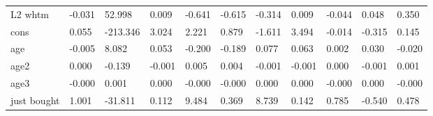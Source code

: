 \begin{table}[htbp]
\begin{tabular}{lllllllllll}
L2 whtm &    -0.031 &    52.998 &     0.009 &    -0.641 &    -0.615 &    -0.314 &     0.009 &    -0.044 &     0.048 &     0.350 \\  
cons &     0.055 &  -213.346 &     3.024 &     2.221 &     0.879 &    -1.611 &     3.494 &    -0.014 &    -0.315 &     0.145 \\  
age &    -0.005 &     8.082 &     0.053 &    -0.200 &    -0.189 &     0.077 &     0.063 &     0.002 &     0.030 &    -0.020 \\  
age2 &     0.000 &    -0.139 &    -0.001 &     0.005 &     0.004 &    -0.001 &    -0.001 &     0.000 &    -0.001 &     0.001 \\  
age3 &    -0.000 &     0.001 &     0.000 &    -0.000 &    -0.000 &     0.000 &     0.000 &    -0.000 &     0.000 &    -0.000 \\  
just bought &     1.001 &   -31.811 &     0.112 &     9.484 &     0.369 &     8.739 &     0.142 &     0.785 &    -0.540 &     0.478 \\  
\hline \hline \end{tabular}
\end{table}
